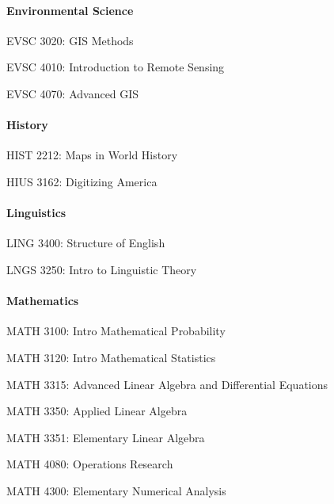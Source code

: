\paragraph{Environmental Science}
\begin{itemlist}
\item EVSC 3020: GIS Methods
\item EVSC 4010: Introduction to Remote Sensing
\item EVSC 4070: Advanced GIS
\end{itemlist}


\paragraph{History}
\begin{itemlist}
\item HIST 2212: Maps in World History
\item HIUS 3162: Digitizing America
\end{itemlist}


\paragraph{Linguistics}
\begin{itemlist}
\item LING 3400: Structure of English
\item LNGS 3250: Intro to Linguistic Theory
\end{itemlist}

\paragraph{Mathematics}
\begin{itemlist}
\item MATH 3100: Intro Mathematical Probability
\item MATH 3120: Intro Mathematical Statistics
\item MATH 3315: Advanced Linear Algebra and Differential Equations
\item MATH 3350: Applied Linear Algebra
\item MATH 3351: Elementary Linear Algebra
\item MATH 4080: Operations Research
\item MATH 4300: Elementary Numerical Analysis
\end{itemlist}

\item 
